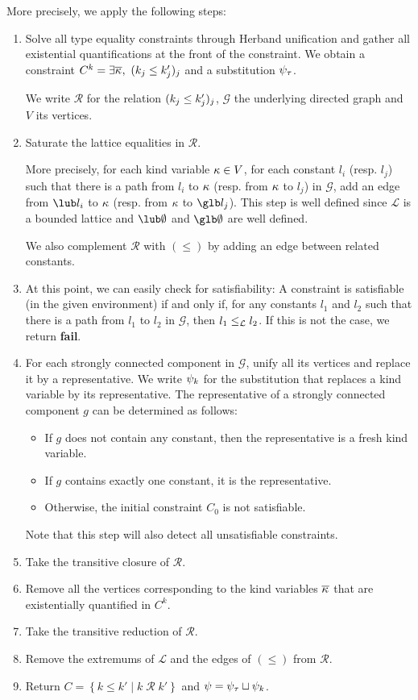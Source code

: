 More precisely, we apply the following steps:
\begin{enumerate}
\item Solve all type equality constraints through Herband unification and
  gather all existential quantifications at the front of the constraint.
  We obtain a constraint $C^k = \exists \overline{\kappa_{{}}},\ (k_j \leq k'_j)_j$ and
  a substitution $\mathrm{\psi}_\tau$.

  We write $\mathcal R$ for the relation $(k_j \leq k'_j)_j$,
  $\mathcal G$ the underlying directed graph and $V$ its vertices.

\item Saturate the lattice equalities in $\mathcal R$.

  More precisely, for each kind variable $\kappa \in V$,
  for each constant $l_i$ (resp. $l_j$) such that
  there is a path from $l_i$ to $\kappa$ (resp. from $\kappa$ to $l_j$) in $\mathcal G$,
  add an edge from $\lub l_i$ to $\kappa$
  (resp. from $\kappa$ to $\glb l_j$).
  This step is well defined since $\mathcal L$ is a bounded lattice
  and $\lub\emptyset$ and $\glb\emptyset$ are well defined.

  We also complement $\mathcal R$ with $(\leq)$ by adding an edge
  between related constants.
\item
  At this point, we can easily check for satisfiability: A constraint
  is satisfiable (in the given environment) if and only if,
  for any constants $l_1$ and $l_2$ such that
  there is a path from $l_1$ to $l_2$ in $\mathcal G$, then $l_1\leq_\mathcal L l_2$.
  If this is not the case, we return \textbf{fail}.

\item For each strongly connected component in $\mathcal G$, unify all its vertices and replace it by a representative.
  We write $\mathrm{\psi}_k$ for the substitution that replaces a kind variable by
  its representative.
  The representative of a strongly connected component $g$ can be determined as follows:
  \begin{itemize}
  \item If $g$ does not contain any constant, then the representative
    is a fresh kind variable.
  \item If $g$ contains exactly one constant, it is the representative.
  \item Otherwise, the initial constraint $C_0$ is not satisfiable.
  \end{itemize}
  Note that this step will also detect all unsatisfiable constraints.
\item Take the transitive closure of $\mathcal R$.
\item Remove all the vertices corresponding to the kind variables $\overline{\kappa_{{}}}$
  that are existentially quantified in $C^k$.
\item Take the transitive reduction of $\mathcal R$.
\item Remove the extremums of $\mathcal L$ and the edges of $(\leq)$
  from $\mathcal R$.
\item Return $C = \left\{ k \leq k' \mid k \operatorname{\mathcal R}k' \right\}$
  and $\mathrm{\psi} =  \mathrm{\psi}_\tau \sqcup \mathrm{\psi}_k$.
\end{enumerate}


